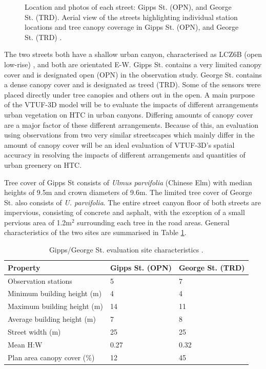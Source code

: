 \documentclass[final,3p,times,authoryear]{elsarticle}
\begin{document}
\begin{figure}[!htbp]
\caption{Location and photos of each street: Gipps St. (OPN), and George St. (TRD). Aerial view of the streets highlighting individual station locations and tree canopy coverage in Gipps St. (OPN), and George St. (TRD) \citep[p.58]{Coutts2015}.\label{fig:GeorgeGippsSt2}} 
\end{figure}

The two streets both have a shallow urban canyon, characterised as LCZ6B (open low-rise) \citep{Stewart2012b}, and both are orientated E-W. Gipps St. contains a very limited canopy cover and is designated open (OPN) in the observation study. George St. contains a dense canopy cover and is designated as treed (TRD). Some of the sensors were placed directly under tree canopies and others out in the open. A main purpose of the VTUF-3D model will be to evaluate the impacts of different arrangements urban vegetation on HTC in urban canyons. Differing amounts of canopy cover are a major factor of these different arrangements. Because of this, an evaluation using observations from two very similar streetscapes which mainly differ in the amount of canopy cover will be an ideal evaluation of VTUF-3D's spatial accuracy in resolving the impacts of different arrangements and quantities of urban greenery on HTC.

Tree cover of Gipps St consists of \textit{Ulmus parvifolia} (Chinese Elm) with median heights of 9.5m and crown diameters of 9.6m. The limited tree cover of George St. also consists of \textit{U. parvifolia}. The entire street canyon floor of both streets are impervious, consisting of concrete and asphalt, with the exception of a small pervious area of 1.2m$^{2}$ surrounding each tree in the road areas. General characteristics of the two sites are summarised in Table \ref{tab:comvalpara}.

\begin{table}[!htbp]
\caption{Gipps/George St. evaluation site characteristics \citep{Coutts2015}. \label{tab:comvalpara}}     
\begin{tabular}{| l | l |l|}
\hline
\textbf{Property} & \textbf{Gipps St. (OPN)} & \textbf{George St. (TRD)} \\ \hline
Observation stations & 5 & 7\\ \hline
Minimum building height (m) & 4 & 4\\ \hline
Maximum building height (m) & 14 & 11\\ \hline
Average building height (m) & 7 & 8 \\ \hline
Street width (m) & 25 & 25 \\ \hline
Mean H:W & 0.27 & 0.32 \\ \hline
Plan area canopy cover (\%) & 12 & 45 \\ \hline

\end{tabular}
\end{table}
\end{document}
